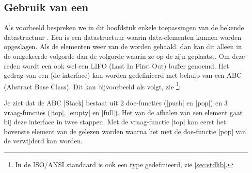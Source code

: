 \begin{cpplstShortInline}


\chapter{Gebruik van een }
\label{sec:Voorbeelden}
Als voorbeeld bespreken we in dit hoofdstuk enkele toepassingen van de bekende datastructuur \emph{}.
Een  is een datastructuur waarin data\hyp{}elementen kunnen worden opgeslagen.
Als de elementen weer van de  worden gehaald, dan kan dit alleen in de omgekeerde volgorde dan de volgorde waarin ze op de  zijn geplaatst.
Om deze reden wordt een  ook wel een LIFO (Last In First Out) buffer genoemd.
Het gedrag van een  (de interface) kan worden gedefinieerd met behulp van een ABC (Abstract Base Class).
Dit kan bijvoorbeeld als volgt, zie \footnote{In de ISO/ANSI \Cpp{} standaard  is ook een type  gedefinieerd, zie \cref{sec:stdlib}.}:


Je ziet dat de ABC |Stack| bestaat uit 2 doe\hyp{}functies (|push| en |pop|) en 3 vraag\hyp{}functies (|top|, |empty| en |full|).
Het van de  afhalen van een element gaat bij deze interface in twee stappen.
Met de vraag\hyp{}functie |top| kan eerst het bovenste element van de  gelezen worden waarna het met de doe\hyp{}functie |pop| van de  verwijderd kan worden.


\end{cpplstShortInline}
